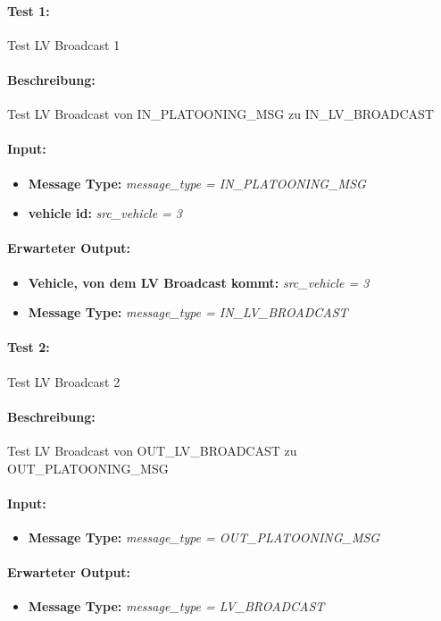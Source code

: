 \documentclass[a4paper, 12pt, titlepage]{scrartcl}
\begin{document}
			\paragraph{Test 1:}{Test LV Broadcast 1
			\paragraph{Beschreibung:} Test LV Broadcast von IN\_PLATOONING\_MSG zu IN\_LV\_BROADCAST
			\paragraph{Input:}
			\begin{itemize} \itemsep-0.5em
				\item \textbf{Message Type:} \emph{message\_type = IN\_PLATOONING\_MSG}
				\item \textbf{vehicle id:} \emph{src\_vehicle = 3}
			\end{itemize}
			\paragraph{Erwarteter Output:}
			\begin{itemize} \itemsep-0.5em
				\item \textbf{Vehicle, von dem LV Broadcast kommt:} \emph{src\_vehicle = 3}
				\item \textbf{Message Type:} \emph{message\_type = IN\_LV\_BROADCAST}
			\end{itemize}

			\paragraph{Test 2:}{Test LV Broadcast 2}
			\paragraph{Beschreibung:} Test LV Broadcast von OUT\_LV\_BROADCAST zu OUT\_PLATOONING\_MSG
			\paragraph{Input:}
			\begin{itemize} \itemsep-0.5em
				\item \textbf{Message Type:} \emph{message\_type = OUT\_PLATOONING\_MSG}
			\end{itemize}
			\paragraph{Erwarteter Output:}
			\begin{itemize} \itemsep-0.5em
				\item \textbf{Message Type:} \emph{message\_type = LV\_BROADCAST}
			\end{itemize}				

}
\end{document}
